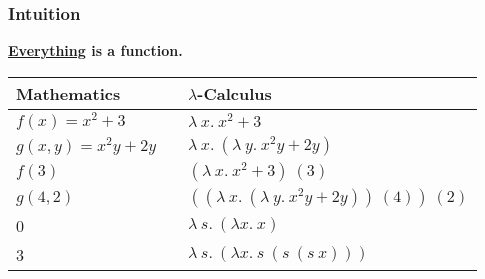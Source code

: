 \documentclass{beamer}
\begin{document}
\begin{frame}
	\frametitle{Intuition}

	\bf{\underline{Everything} is a function.}


	\begin{center}
		\begin{tabular}{l c l}
			Mathematics & \hspace{1cm} & $\lambda$-Calculus \\
			\hline
			$f(x) = x^{2} + 3$ & & $\lambda \ x. \ x^{2} + 3$ \\
			$g(x,y) = x^{2}y + 2y$ & & $\lambda \ x. \ (\lambda \ y. \ x^{2}y + 2y)$\\
			$f(3)$ & & $(\lambda \ x. \ x^{2} + 3) \ (3)$ \\
			$g(4,2)$ & & $((\lambda \ x. \ (\lambda \ y. \ x^{2}y + 2y)) \ (4)) \ (2)$\\
			0 & & $\lambda \ s. \ (\lambda x. \ x)$\\
			3 & & $\lambda \ s. \ (\lambda x. \ s \ (s \ (s \ x)))$\\
		\end{tabular}
	\end{center}

	\vspace{30mm}

\end{frame}
\end{document}
